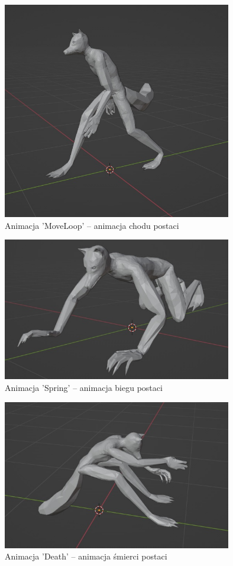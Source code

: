 \documentclass[12pt,twoside]{article}
\begin{document}
\begin{figure}[!ht]
    \centering
	\includegraphics[width=10cm]{RealizacjaProjektu/MC/Animation_Move_Loop.jpg}
	\caption{Animacja 'MoveLoop' -- animacja chodu postaci}
    \label{Animation:MoveLoop}
\end{figure}
\begin{figure}[!ht]
    \centering
	\includegraphics[width=10cm]{RealizacjaProjektu/MC/Animation_Sprint.jpg}
	\caption{Animacja 'Spring' -- animacja biegu postaci}
    \label{Animation:Sprint}
\end{figure}
\begin{figure}[!ht]
    \centering
	\includegraphics[width=10cm]{RealizacjaProjektu/MC/Animation_Death.jpg}
	\caption{Animacja 'Death' -- animacja śmierci postaci}
    \label{Animation:Death}
\end{figure}
\clearpage
\end{document}
